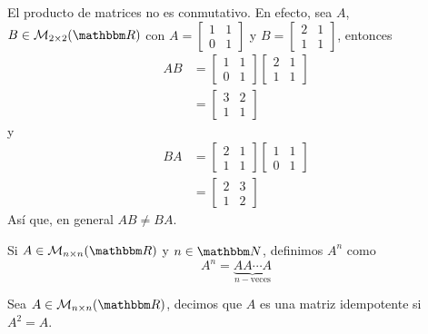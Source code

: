 \begin{observation}
    El producto de matrices no es conmutativo. En efecto, sea $A$, $B \in \mathcal{M}_{2 \times 2}(\RR)$ con $A = \begin{bmatrix}
        1 & 1 \\
        0 & 1
    \end{bmatrix}$ y $B = \begin{bmatrix}
        2 & 1 \\
        1 & 1
    \end{bmatrix}$, entonces
    \begin{align*}
        AB & = \begin{bmatrix}
            1 & 1 \\
            0 & 1
        \end{bmatrix} \begin{bmatrix}
            2 & 1 \\
            1 & 1
        \end{bmatrix} \\
        & = \begin{bmatrix}
            3 & 2 \\
            1 & 1
        \end{bmatrix}
    \end{align*}
    y
    \begin{align*}
        BA & = \begin{bmatrix}
            2 & 1 \\
            1 & 1
        \end{bmatrix} \begin{bmatrix}
            1 & 1 \\
            0 & 1
        \end{bmatrix} \\
        & = \begin{bmatrix}
            2 & 3 \\
            1 & 2
        \end{bmatrix}
    \end{align*}
    Así que, en general $AB \neq BA$.
\end{observation}

\begin{notation}
    Si $A \in \mathcal{M}_{n \times n}(\RR)$ y $n \in \NN$, definimos $A^n$ como
    $$A^n = \underbrace{A A \cdots A}_{n-\text{veces}}$$
\end{notation}

\begin{definition}\label{def:matriz-idempotente}
    Sea $A \in \mathcal{M}_{n \times n}(\RR)$, decimos que $A$ es una matriz idempotente si $A^2=A$.
\end{definition}

